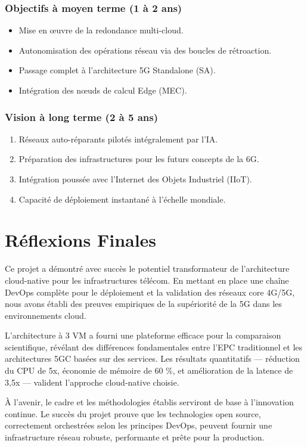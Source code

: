 \documentclass[12pt,a4paper]{report}
\begin{document}
\subsubsection{Objectifs à moyen terme (1 à 2 ans)}
\begin{itemize}
    \item Mise en œuvre de la redondance multi-cloud.
    \item Autonomisation des opérations réseau via des boucles de rétroaction.
    \item Passage complet à l'architecture 5G Standalone (SA).
    \item Intégration des nœuds de calcul Edge (MEC).
\end{itemize}

\subsubsection{Vision à long terme (2 à 5 ans)}
\begin{enumerate}
    \item Réseaux auto-réparants pilotés intégralement par l'IA.
    \item Préparation des infrastructures pour les futurs concepts de la 6G.
    \item Intégration poussée avec l'Internet des Objets Industriel (IIoT).
    \item Capacité de déploiement instantané à l'échelle mondiale.
\end{enumerate}

\section{Réflexions Finales}

Ce projet a démontré avec succès le potentiel transformateur de l'architecture cloud-native pour les infrastructures télécom. En mettant en place une chaîne DevOps complète pour le déploiement et la validation des réseaux core 4G/5G, nous avons établi des preuves empiriques de la supériorité de la 5G dans les environnements cloud.

L'architecture à 3 VM a fourni une plateforme efficace pour la comparaison scientifique, révélant des différences fondamentales entre l'EPC traditionnel et les architectures 5GC basées sur des services. Les résultats quantitatifs — réduction du CPU de 5x, économie de mémoire de 60 \%, et amélioration de la latence de 3,5x — valident l'approche cloud-native choisie.

À l'avenir, le cadre et les méthodologies établis serviront de base à l'innovation continue. Le succès du projet prouve que les technologies open source, correctement orchestrées selon les principes DevOps, peuvent fournir une infrastructure réseau robuste, performante et prête pour la production.
\end{document}
